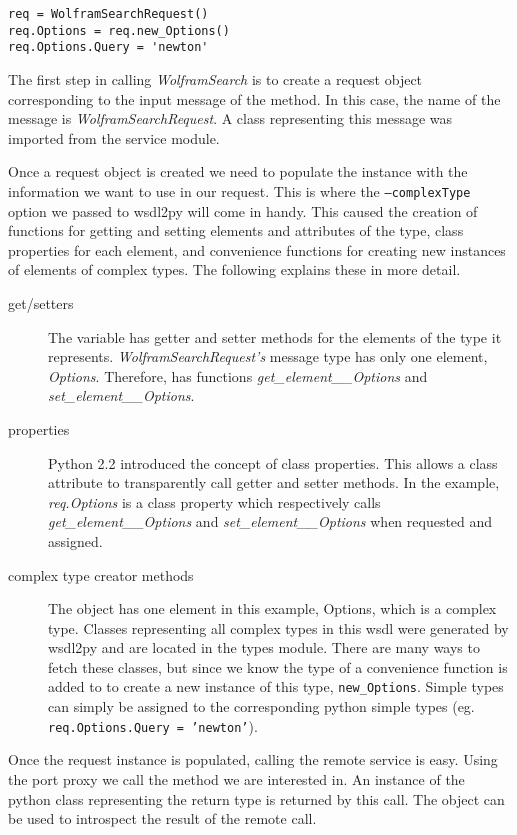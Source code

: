 \begin{verbatim}
req = WolframSearchRequest()
req.Options = req.new_Options()
req.Options.Query = 'newton'
\end{verbatim}

The first step in calling {\it WolframSearch} is to create a request object
corresponding to the input message of the method.  In this case, the name of
the message is {\it WolframSearchRequest}.  A class representing this message
was imported from the service module.

Once a request object is created we need to populate the instance with the
information we want to use in our request.  This is where the {\tt --complexType}
option we passed to wsdl2py will come in handy.  This caused the creation of 
functions for getting and setting elements and attributes of the type, class 
properties for each element, and convenience functions for creating new instances
of elements of complex types.  The following explains these in more detail.

\begin{description}
\item[get/setters] The  variable has getter and setter methods for the
elements of the type it represents.  {\it WolframSearchRequest's} message type
has only one element, {\it Options}.  Therefore,  has functions
{\it get_element__Options} and {\it set_element__Options}.

\item[properties] Python 2.2 introduced the concept of class properties.  This
allows a class attribute to transparently call getter and setter methods.  In the
example, {\it req.Options} is a class property which respectively calls 
{\it get_element__Options} and {\it set_element__Options} when requested 
and assigned.

\item[complex type creator methods] The  object has one element in this
example, Options, which is a complex type.  Classes representing all complex types
in this wsdl were generated by wsdl2py and are located in the types module.  There
are many ways to fetch these classes, but since we know the type of 
a convenience function is added to  to create a new instance of this type,
{\tt new_Options}.  Simple types can simply be assigned to the corresponding python
simple types (eg. {\tt req.Options.Query = 'newton'}).
\end{description}

Once the request instance is populated, calling the remote service is easy.  Using
the port proxy we call the method we are interested in.  An instance of the python
class representing the return type is returned by this call.  The  object
can be used to introspect the result of the remote call.

